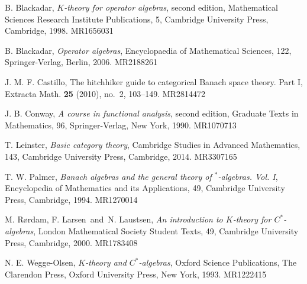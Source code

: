 \documentclass[a4paper,11pt]{article}
\theoremstyle{definition}
\begin{document}
\begin{thebibliography}{99}

 B. Blackadar, {\it $K$-theory for operator algebras}, second edition, Mathematical Sciences Research Institute Publications, 5, Cambridge University Press, Cambridge, 1998. MR1656031

 B. Blackadar, {\it Operator algebras}, Encyclopaedia of Mathematical Sciences, 122, Springer-Verlag, Berlin, 2006. MR2188261

 J. M. F. Castillo, The hitchhiker guide to categorical Banach space theory. Part I, Extracta Math. {\bf 25} (2010), no.~2, 103--149. MR2814472

 J. B. Conway, {\it A course in functional analysis}, second edition, Graduate Texts in Mathematics, 96, Springer-Verlag, New York, 1990. MR1070713

 T. Leinster, {\it Basic category theory}, Cambridge Studies in Advanced Mathematics, 143, Cambridge University Press, Cambridge, 2014. MR3307165

 T. W. Palmer, {\it Banach algebras and the general theory of $^*$-algebras. Vol. I}, Encyclopedia of Mathematics and its Applications, 49, Cambridge University Press, Cambridge, 1994. MR1270014

 M. R\o rdam, F. Larsen\ and\ N. Laustsen, {\it An introduction to $K$-theory for $C^*$-algebras}, London Mathematical Society Student Texts, 49, Cambridge University Press, Cambridge, 2000. MR1783408

 N. E. Wegge-Olsen, {\it $K$-theory and $C^*$-algebras}, Oxford Science Publications, The Clarendon Press, Oxford University Press, New York, 1993. MR1222415

\end{thebibliography}
\end{document}
